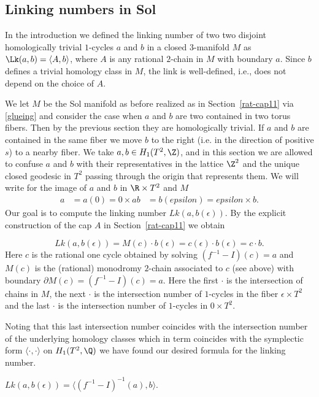 \subsection{Linking numbers in Sol} \label{generaltheoryoflink}


In the introduction we defined the linking number of two two disjoint
homologically trivial $1$-cycles $a$ and $b$ in a closed $3$-manifold
$M$ as $\Lk(a,b) = \langle A,b \rangle$, where $A$ is any rational
$2$-chain in $M$ with boundary $a$. Since $b$ defines a trivial
homology class in $M$, the link is well-defined, i.e., does not depend
on the choice of $A$.

We let $M$ be the Sol manifold as before realized as in
Section~\ref{rat-cap11} via \eqref{glueing} and consider the case
when $a$ and $b$ are two contained in two torus fibers. Then by the
previous section they are homologically trivial. If $a$ and $b$ are
contained in the same fiber we move $b$ to the right (i.e. in the
direction of positive $s$)  to a nearby fiber. We take $a,b \in
H_1(T^2,\Z)$, and in this section we are allowed to confuse $a$ and
$b$ with their representatives in the lattice $\Z^2$ and the unique
closed geodesic in $T^2$ passing through the origin that represents
them. We will write for the image of $a$ and $b$ in $\R \times T^2$
and $M$ 
\begin{align*} 
    a &=a(0)=0 \times a
    b &=b(epsilon)= epsilon \times b.
\end{align*} 
Our
goal is to compute the linking number $Lk(a, b(\epsilon))$. By the
explicit construction of the cap $A$ in Section~\ref{rat-cap11} we
obtain

\begin{lemma}
 \[
 Lk(a,b(\epsilon)) = M(c) \cdot b(\epsilon) = c(\epsilon) \cdot b(\epsilon)= c \cdot b.
 \] 
Here $c$ is the rational one cycle obtained by solving $(f^{-1} - I) (c) =a$
and $M(c)$ is the (rational) monodromy $2$-chain associated to $c$
(see above) with boundary $\partial M(c) = (f^{-1} - I) (c) =a$.
Here the first $\cdot$ is the intersection of
chains in $M$, the next $\cdot$ is the intersection number of
$1$-cycles in the fiber $\epsilon \times T^2$ and the last $\cdot$
is the intersection number of $1$-cycles in $0 \times T^2$.
 \end{lemma}

Noting that this last intersection number coincides with the
intersection number of the underlying homology classes which in
term coincides with the symplectic form $\langle \cdot, \cdot
\rangle$ on $H_1(T^2,\Q)$ we have found our desired formula for the
linking number.
\begin{theorem}\label{linkSol}
$ Lk(a, b(\epsilon)) = \langle (f^{-1} - I)^{-1} (a), b \rangle.$
\end{theorem}

